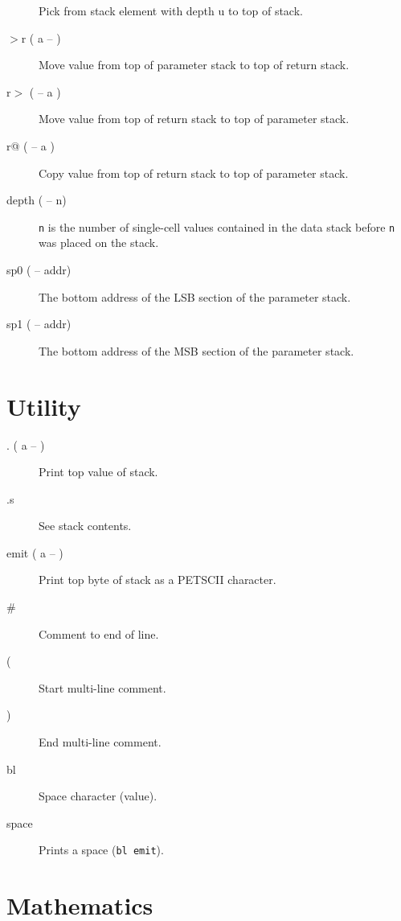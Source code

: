 \begin{description}
Pick from stack element with depth u to top of stack.

\item[$>$r ( a -- )]

Move value from top of parameter stack to top of return stack. 

\item[r$>$ ( -- a )]

Move value from top of return stack to top of parameter stack. 

\item[r@ ( -- a )]

Copy value from top of return stack to top of parameter stack. 

\item[depth ( -- n)] 

\texttt{n} is the number of single-cell values contained in the data stack before \texttt{n} was placed on the stack.

\item[sp0 ( -- addr)] 

The bottom address of the LSB section of the parameter stack.

\item[sp1 ( -- addr)] 

The bottom address of the MSB section of the parameter stack.

\end{description}

\section{Utility}

\begin{description}
\item[. ( a -- )] Print top value of stack.
\item[.s] See stack contents.
\item[emit ( a -- )] Print top byte of stack as a PETSCII character.
\item[\#] Comment to end of line.
\item[(] Start multi-line comment.
\item[)] End multi-line comment.
\item[bl] Space character (value).
\item[space] Prints a space (\texttt{bl emit}).
\end{description}

\section{Mathematics}

